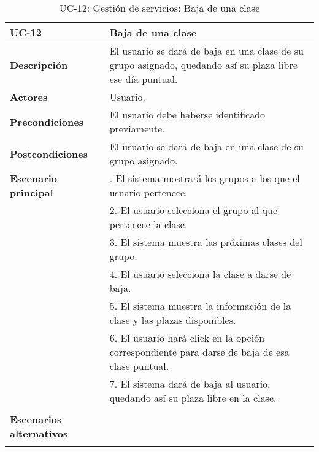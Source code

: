 \begin{table}[H]
  \begin{center}
    \begin{tabularx}{16.4cm}{|l|X|}
      \hline
      \textbf{UC-12} & \textbf{Baja de una clase}\\
      \hline
      \textbf{Descripción} & El usuario se dará de baja en una clase de su grupo asignado, quedando así su plaza libre ese día puntual.\\
      \hline
      \textbf{Actores} & Usuario.\\
      \hline
      \textbf{Precondiciones} & El usuario debe haberse identificado previamente.\\
      \hline
      \textbf{Postcondiciones} & El usuario se dará de baja en una clase de su grupo asignado.\\
      \hline
      \textbf{Escenario principal} & \smallskip 1. El sistema mostrará los grupos a los que el usuario pertenece.\\
      & 2. El usuario selecciona el grupo al que pertenece la clase. \\
      & 3. El sistema muestra las próximas clases del grupo.\\
      & 4. El usuario selecciona la clase a darse de baja.\\
      & 5. El sistema muestra la información de la clase y las plazas disponibles.\\
      & 6. El usuario hará click en la opción correspondiente para darse de baja de esa clase puntual.\\
      & 7. El sistema dará de baja al usuario, quedando así su plaza libre en la clase. \\
      & \\
      \hline
      \textbf{Escenarios alternativos} & \\
      & \\
      \hline
    \end{tabularx}
    \caption{UC-12: Gestión de servicios: Baja de una clase}
  \end{center}
\end{table}



